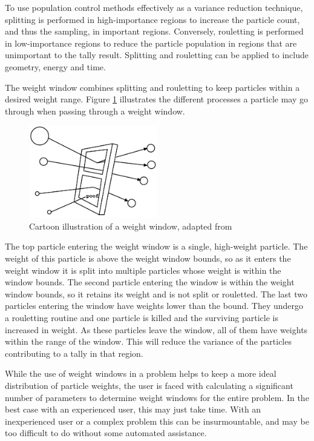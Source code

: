 To use population control methods effectively as a variance reduction technique,
splitting is performed in high-importance regions to increase the particle
count, and thus the sampling, in important regions. Conversely, rouletting is
performed in
 low-importance
  regions to reduce the particle population in regions that are unimportant to
  the tally result.
Splitting and rouletting can be applied to include geometry, energy and time.

The weight window combines splitting and rouletting to keep particles within a
desired weight range. Figure \ref{fig:ww-mcnp}
illustrates the different processes a particle may go through when passing
through a
weight window.
%
\begin{figure}
  \centering
  \includegraphics[width=0.5\textwidth]{./chapters/lit_review/figures/ww-mcnp.png}
  \caption[Weight window illustration]{Cartoon illustration of a weight window,
    adapted from \cite{brown_mcnp_2002, mcnp_manual_v2}}
  \label{fig:ww-mcnp}
\end{figure}
%
The top  particle entering the weight window is a single, high-weight
particle. The weight of this particle is above the weight window bounds, so as
it enters the weight window it is split into multiple particles whose weight is
within the window bounds. The second particle entering the window is within the
weight window bounds, so it retains its weight and is not split or rouletted.
The last two particles entering the window have weights lower than the bound.
They undergo a rouletting routine and one particle is killed and the surviving
particle is increased in weight. As these particles leave the window, all of
them have weights within the range of the window. This will reduce the variance
of the particles contributing to a tally in that region.

While the use of weight windows in a problem helps to keep a more ideal
distribution of particle weights, the user is
faced with calculating a significant number of parameters to
determine weight windows for the entire problem. In the best case with an
experienced user, this may just take time. With an inexperienced user or a
complex problem this can
be insurmountable, and may be too difficult to do without some automated
assistance.


